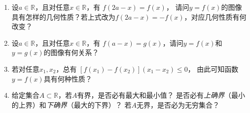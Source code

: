 \begin{enumerate}
  \item 设$a\in\mathbb{R}$，且对任意$x\in\mathbb{R}$，有
  $f(2a-x)=f(x)$，
  请问$y=f(x)$的图像具有怎样的几何性质？若上式改为$f(2a-x)=-f(x)$，对应几何性质有何改变？
  \item 设$a\in\mathbb{R}$，且对任意$x\in\mathbb{R}$，有
  $f(a-x)=g(x)$，请问$y=f(x)$和$y=g(x)$的图像有何关系？
  \item 若对任意$x_1,x_2$，总有
  $[f(x_1)-f(x_2)](x_1-x_2)\leq 0$，
  由此可知函数$y=f(x)$具有何种性质？
  \item 给定集合$A\subset\mathbb{R}$，若$A$有界，是否必有最大和最小值？
  是否必有{\it 上确界}（最小的上界）和{\it 下确界}（最大的下界）？
  若$A$无界，是否必为无穷集合？
\end{enumerate}